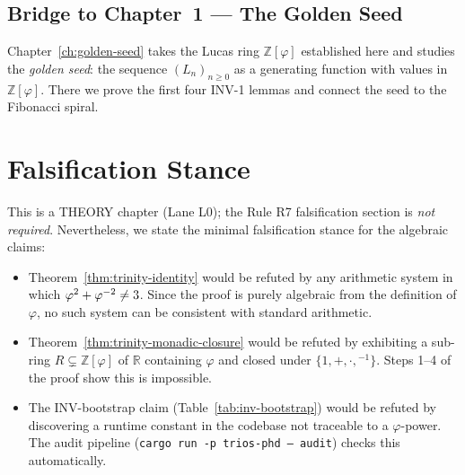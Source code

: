\subsection{Bridge to Chapter~1 — The Golden Seed}

Chapter~\ref{ch:golden-seed} takes the Lucas ring $\mathbb{Z}[\varphi]$
established here and studies the \emph{golden seed}: the sequence
$(L_n)_{n \geq 0}$ as a generating function with values in
$\mathbb{Z}[\varphi]$.  There we prove the first four INV-1 lemmas
and connect the seed to the Fibonacci spiral.


\section{Falsification Stance}
\label{sec:monad-falsification}

This is a THEORY chapter (Lane L0); the Rule R7 falsification section
is \emph{not required}.  Nevertheless, we state the minimal falsification
stance for the algebraic claims:

\begin{itemize}
  \item Theorem~\ref{thm:trinity-identity} would be refuted by any
    arithmetic system in which $\varphi^{2} + \varphi^{-2} \neq 3$.
    Since the proof is purely algebraic from the definition of $\varphi$,
    no such system can be consistent with standard arithmetic.
  \item Theorem~\ref{thm:trinity-monadic-closure} would be refuted by
    exhibiting a sub-ring $R \subsetneq \mathbb{Z}[\varphi]$ of $\mathbb{R}$
    containing $\varphi$ and closed under $\{1,+,\cdot,{}^{-1}\}$.
    Steps 1--4 of the proof show this is impossible.
  \item The INV-bootstrap claim (Table~\ref{tab:inv-bootstrap}) would be
    refuted by discovering a runtime constant in the codebase not traceable
    to a $\varphi$-power.  The audit pipeline
    (\texttt{cargo run -p trios-phd -- audit}) checks this automatically.
\end{itemize}


